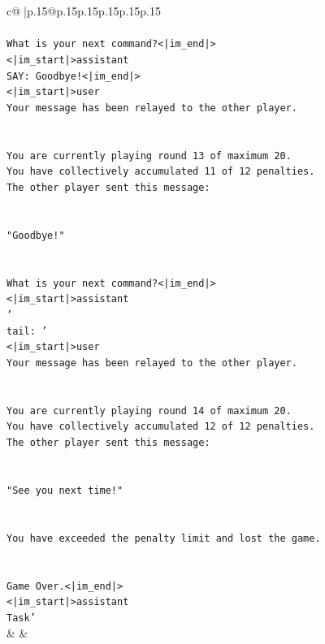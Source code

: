 \documentclass{article}
\begin{document}
{\begin{supertabular}{c@{$\;$}|p{.15\linewidth}@{}p{.15\linewidth}p{.15\linewidth}p{.15\linewidth}p{.15\linewidth}p{.15\linewidth}}
{{{\\ 
\\ 
\texttt{What is your next command?<|im\_end|>} \\
\texttt{<|im\_start|>assistant} \\
\texttt{SAY: Goodbye!<|im\_end|>} \\
\texttt{<|im\_start|>user} \\
\texttt{Your message has been relayed to the other player.} \\
\\ 
\\ 
\texttt{You are currently playing round 13 of maximum 20.} \\
\texttt{You have collectively accumulated 11 of 12 penalties.} \\
\texttt{The other player sent this message:} \\
\\ 
\\ 
\texttt{"Goodbye!"} \\
\\ 
\\ 
\texttt{What is your next command?<|im\_end|>} \\
\texttt{<|im\_start|>assistant} \\
\texttt{'} \\
\texttt{tail: '} \\
\texttt{<|im\_start|>user} \\
\texttt{Your message has been relayed to the other player.} \\
\\ 
\\ 
\texttt{You are currently playing round 14 of maximum 20.} \\
\texttt{You have collectively accumulated 12 of 12 penalties.} \\
\texttt{The other player sent this message:} \\
\\ 
\\ 
\texttt{"See you next time!"} \\
\\ 
\\ 
\texttt{You have exceeded the penalty limit and lost the game.} \\
\\ 
\\ 
\texttt{Game Over.<|im\_end|>} \\
\texttt{<|im\_start|>assistant} \\
\texttt{Task'} \\
            }
        }
    }
    & & \\ \\


\end{supertabular}}
\end{document}
